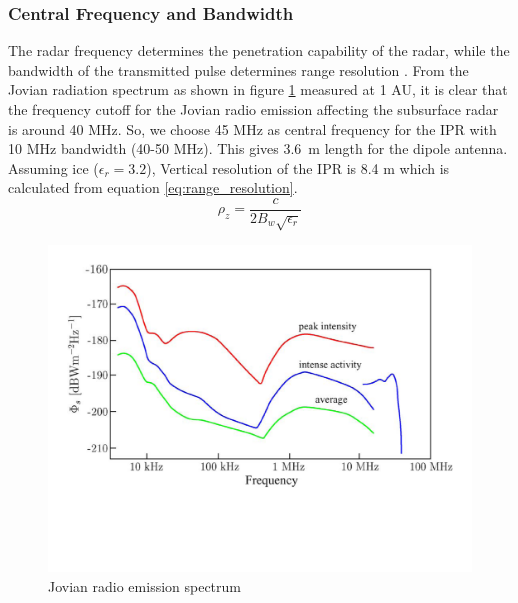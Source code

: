 \subsubsection{Central Frequency and Bandwidth}
The radar frequency determines the penetration capability of the radar, while the bandwidth of the transmitted pulse determines range resolution \cite{penetrartion}. From the Jovian radiation spectrum as shown in figure \ref{fig:Jovian_radio_emission} measured at 1 AU, it is clear that the frequency cutoff for the Jovian radio emission affecting the subsurface radar is around 40 MHz. So, we choose 45 MHz as central frequency for the \ac{IPR} with 10 MHz bandwidth (40-50 MHz). This gives 3.6~m length for the dipole antenna. Assuming ice ($\epsilon_{r} = 3.2$), Vertical resolution of the \ac{IPR} is 8.4 m which is calculated from equation \ref{eq:range_resolution}.
%
\begin{equation}
\rho_{z} = \dfrac{c}{2B_{w}\sqrt{\epsilon_{r}}}
\label{eq:range_resolution}
\end{equation}
%
\begin{figure}[bht]
\centering
\includegraphics[scale=0.5]{Figures/Jovian_radio_emission.pdf}
\caption{Jovian radio emission spectrum \cite{Gany_SRS}} 
\label{fig:Jovian_radio_emission}
\end{figure}
%
